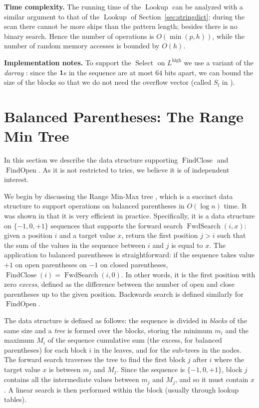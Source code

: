 \documentclass[a4paper,11pt]{article}
\newcommand{\ttlpar}[1]{\noindent\textbf{#1}}
\theoremstyle{nonumberplain}
\DeclareMathOperator{\Select}{Select}
\DeclareMathOperator{\Lookup}{Lookup}
\DeclareMathOperator{\fwdsearch}{FwdSearch}
\DeclareMathOperator{\FindClose}{FindClose}
\DeclareMathOperator{\FindOpen}{FindOpen}
\newcommand{\bit}[1]{\text{\bf\texttt{#1}}}
\newcommand{\bitone}{\bit{1}}
\newcommand{\Lhigh}{L^\text{high}}
\begin{document}
\ttlpar{Time complexity.}
The running time of the $\Lookup$ can be analyzed with a similar
argument to that of the $\Lookup$ of
Section~\ref{sec:stringdict}: during the scan there cannot be more
skips than the pattern length; besides there is no binary
search. Hence the number of operations is $O(\min(p, h))$, 
while the number of random
memory accesses is bounded by $O(h)$.

\ttlpar{Implementation notes.} 
To support the $\Select$ on $\Lhigh$ we
use a variant of the \emph{darray} \cite{sadaalx07}: since the $\bitone$s in
the sequence are at most $64$ bits apart, we can bound the size of the
blocks so that we do not need the overflow vector (called $S_l$ in
\cite{sadaalx07}).

\section{Balanced Parentheses: The Range Min Tree}
\label{sec:rmtree}

In this section we describe the data structure supporting $\FindClose$
and $\FindOpen$. As it is not restricted to tries, we believe it is of
independent interest.

We begin by discussing the Range Min-Max tree \cite{bpsoda10}, which
is a succinct data structure to support operations on balanced
parentheses in $O(\log n)$ time. It was shown in \cite{bpalx10} that
it is very efficient in practice. Specifically, it is a data structure
on $\{-1, 0, +1\}$ sequences that supports the forward search
$\fwdsearch(i, x)$: given a position $i$ and a target value $x$,
return the first position $j > i$ such that the sum of the values in
the sequence between $i$ and $j$ is equal to $x$. The application to
balanced parentheses is straightforward: if the sequence takes value
$+1$ on open parentheses on $-1$ on closed parentheses, $\FindClose(i)
= \fwdsearch(i, 0)$. In other words, it is the first position with
zero \emph{excess}, defined as the difference between the number of
open and close parentheses up to the given position.  Backwards search
is defined similarly for $\FindOpen$.

The data structure is defined as follows: the sequence is divided in
\emph{blocks} of the same size and a \emph{tree} is formed over the
blocks, storing the minimum $m_i$ and the maximum $M_i$ of the
sequence cumulative sum (the excess, for balanced parentheses) for
each block $i$ in the leaves, and for the sub-trees in the nodes. The
forward search traverses the tree to find the first block $j$ after
$i$ where the target value $x$ is between $m_j$ and $M_j$. Since the
sequence is $\{-1, 0, +1\}$, block $j$ contains all the intermediate
values between $m_j$ and $M_j$, and so it must contain $x$. A linear
search is then performed within the block (usually through lookup
tables).
\end{document}
